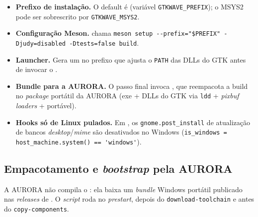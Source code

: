 \begin{itemize}
  \item \textbf{Prefixo de instalação.} O default é
         (variável \lstinline|GTKWAVE_PREFIX|); o
        MSYS2 pode ser sobrescrito por \lstinline|GTKWAVE_MSYS2|.
  \item \textbf{Configuração Meson.}  chama
        \lstinline|meson setup --prefix="$PREFIX" -Djudy=disabled -Dtests=false build|.
  \item \textbf{Launcher.} Gera um  no prefixo que ajusta o
        \lstinline|PATH| das DLLs do GTK antes de invocar o .
  \item \textbf{Bundle para a AURORA.} O passo final invoca
        , que reempacota a build no \emph{package}
        portátil da AURORA (exe + DLLs do GTK via \lstinline|ldd| + \emph{pixbuf
        loaders} +  portável).
  \item \textbf{Hooks só de Linux pulados.} Em , os
        \lstinline|gnome.post_install| de atualização de bancos
        \emph{desktop}/\emph{mime} são desativados no Windows
        (\lstinline|is_windows = host_machine.system() == 'windows'|).
\end{itemize}

\subsection{Empacotamento e \emph{bootstrap} pela AURORA}
\label{sec:cap10-gtkwave-bootstrap}

A AURORA não compila o : ela baixa um \emph{bundle} Windows portátil
publicado nas \emph{releases} de . O \emph{script}
 roda no \emph{prestart},
depois do \texttt{download-toolchain} e antes do \texttt{copy-components}.

